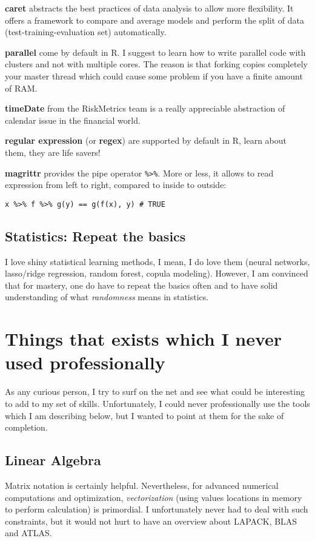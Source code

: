 \documentclass[11pt]{article}
\begin{document}
\textbf{caret} abstracts the best practices of data analysis to allow more
flexibility. It offers a framework to compare and average models and perform
the split of data (test-training-evaluation set) automatically.

\textbf{parallel} come by default in R. I suggest to learn how to write parallel
code with clusters and not with multiple cores. The reason is that forking
copies completely your master thread which could cause some problem if you
have a finite amount of RAM.

\textbf{timeDate} from the RiskMetrics team is a really appreciable abstraction of
calendar issue in the financial world.

\textbf{regular expression} (or \textbf{regex}) are supported by default in R, learn about
them, they are life savers!

\textbf{magrittr} provides the pipe operator \texttt{\%>\%}. More or less, it allows to read
expression from left to right, compared to inside to outside:
\begin{verbatim}
x %>% f %>% g(y) == g(f(x), y) # TRUE
\end{verbatim}

\subsection{Statistics: Repeat the basics}
\label{sec:org1c0313d}
I love shiny statistical learning methods, I mean, I do love them (neural
networks, lasso/ridge regression, random forest, copula modeling). However, I
am convinced that for mastery, one do have to repeat the basics often and to
have solid understanding of what \emph{randomness} means in statistics.

\section{Things that exists which I never used professionally}
\label{sec:org385b151}
As any curious person, I try to surf on the net and see what could be
interesting to add to my set of skills. Unfortunately, I could never
professionally use the tools which I am describing below, but I wanted to
point at them for the sake of completion.

\subsection{Linear Algebra}
\label{sec:orgd2850f4}
Matrix notation is certainly helpful. Nevertheless, for advanced numerical
computations and optimization, \emph{vectorization} (using values locations in
memory to perform calculation) is primordial. I unfortunately never had to
deal with such constraints, but it would not hurt to have an overview about
LAPACK, BLAS and ATLAS.
\end{document}
